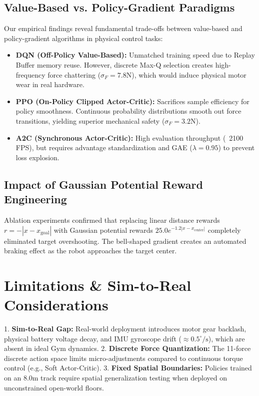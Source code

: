 \documentclass[journal,twocolumn]{IEEEtran}
\begin{document}
\subsection{Value-Based vs. Policy-Gradient Paradigms}
Our empirical findings reveal fundamental trade-offs between value-based and policy-gradient algorithms in physical control tasks:
\begin{itemize}[leftmargin=*]
\item \textbf{DQN (Off-Policy Value-Based):} Unmatched training speed due to Replay Buffer memory reuse. However, discrete Max-Q selection creates high-frequency force chattering ($\sigma_F = 7.8\text{N}$), which would induce physical motor wear in real hardware.
\item \textbf{PPO (On-Policy Clipped Actor-Critic):} Sacrifices sample efficiency for policy smoothness. Continuous probability distributions smooth out force transitions, yielding superior mechanical safety ($\sigma_F = 3.2\text{N}$).
\item \textbf{A2C (Synchronous Actor-Critic):} High evaluation throughput (~2100 FPS), but requires advantage standardization and GAE ($\lambda=0.95$) to prevent loss explosion.
\end{itemize}

\subsection{Impact of Gaussian Potential Reward Engineering}
Ablation experiments confirmed that replacing linear distance rewards $r = -|x - x_{\text{goal}}|$ with Gaussian potential rewards $25.0 e^{-1.2 |x - x_{\text{center}}|}$ completely eliminated target overshooting. The bell-shaped gradient creates an automated braking effect as the robot approaches the target center.

\section{Limitations \& Sim-to-Real Considerations}
1. \textbf{Sim-to-Real Gap:} Real-world deployment introduces motor gear backlash, physical battery voltage decay, and IMU gyroscope drift ($\approx 0.5^\circ/\text{s}$), which are absent in ideal Gym dynamics.
2. \textbf{Discrete Force Quantization:} The 11-force discrete action space limits micro-adjustments compared to continuous torque control (e.g., Soft Actor-Critic).
3. \textbf{Fixed Spatial Boundaries:} Policies trained on an 8.0m track require spatial generalization testing when deployed on unconstrained open-world floors.
\end{document}
